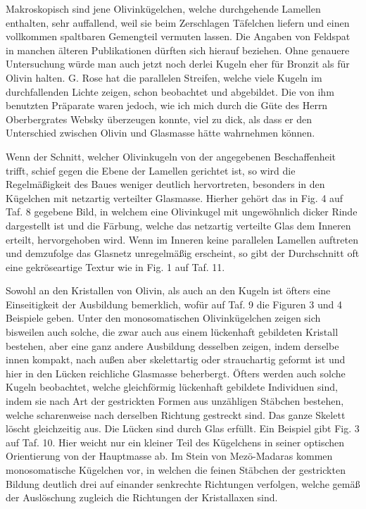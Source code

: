 \documentclass[a4paper, 11pt, oneside, polutonikogreek, german]{article}
\begin{document}
Makroskopisch sind jene Olivinkügelchen, welche durchgehende Lamellen enthalten, sehr auffallend, weil sie beim Zerschlagen Täfelchen liefern und einen vollkommen spaltbaren Gemengteil vermuten lassen. Die Angaben von Feldspat in manchen älteren Publikationen dürften sich hierauf beziehen. Ohne genauere Untersuchung würde man auch jetzt noch derlei Kugeln eher für Bronzit als für Olivin halten. G. Rose hat die parallelen Streifen, welche viele Kugeln im durchfallenden Lichte zeigen, schon beobachtet und abgebildet. Die von ihm benutzten Präparate waren jedoch, wie ich mich durch die Güte des Herrn Oberbergrates Websky überzeugen konnte, viel zu dick, als dass er den Unterschied zwischen Olivin und Glasmasse hätte wahrnehmen können.

Wenn der Schnitt, welcher Olivinkugeln von der angegebenen Beschaffenheit trifft, schief gegen die Ebene der Lamellen gerichtet ist, so wird die Regelmäßigkeit des Baues weniger deutlich hervortreten, besonders in den Kügelchen mit netzartig verteilter Glasmasse. Hierher gehört das in Fig. 4 auf Taf. 8 gegebene Bild, in welchem eine Olivinkugel mit ungewöhnlich dicker Rinde dargestellt ist und die Färbung, welche das netzartig verteilte Glas dem Inneren erteilt, hervorgehoben wird. Wenn im Inneren keine parallelen Lamellen auftreten und demzufolge das Glasnetz unregelmäßig erscheint, so gibt der Durchschnitt oft eine gekröseartige Textur wie in Fig. 1 auf Taf. 11.

Sowohl an den Kristallen von Olivin, als auch an den Kugeln ist öfters eine Einseitigkeit der Ausbildung bemerklich, wofür auf Taf. 9 die Figuren 3 und 4 Beispiele geben. Unter den monosomatischen Olivinkügelchen zeigen sich bisweilen auch solche, die zwar auch aus einem lückenhaft gebildeten Kristall bestehen, aber eine ganz andere Ausbildung desselben zeigen, indem derselbe innen kompakt, nach außen aber skelettartig oder strauchartig geformt ist und hier in den Lücken reichliche Glasmasse beherbergt. Öfters werden auch solche Kugeln beobachtet, welche gleichförmig lückenhaft gebildete Individuen sind, indem sie nach Art der gestrickten Formen aus unzähligen Stäbchen bestehen, welche scharenweise nach derselben Richtung gestreckt sind. Das ganze Skelett löscht gleichzeitig aus. Die Lücken sind durch Glas erfüllt. Ein Beispiel gibt Fig. 3 auf Taf. 10. Hier weicht nur ein kleiner Teil des Kügelchens in seiner optischen Orientierung von der Hauptmasse ab. Im Stein von Mezö-Madaras kommen monosomatische Kügelchen vor, in welchen die feinen Stäbchen der gestrickten Bildung deutlich drei auf einander senkrechte Richtungen verfolgen, welche gemäß der Auslöschung zugleich die Richtungen der Kristallaxen sind.
\end{document}
